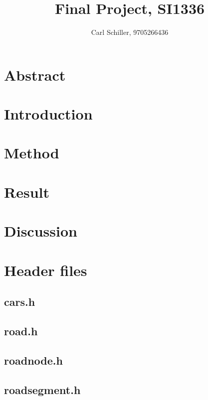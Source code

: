 \documentclass{article}
\author{Carl Schiller, 9705266436}
\title{Final Project, SI1336}
\begin{document}
\maketitle

\section*{Abstract}

\tableofcontents

\section{Introduction}

\section{Method}

\section{Result}

\section{Discussion}

\pagebreak
\appendix

\section{Header files}
  \subsection{cars.h}
    
  \subsection{road.h}
    
  \subsection{roadnode.h}
    
  \subsection{roadsegment.h}
    
\end{document}
